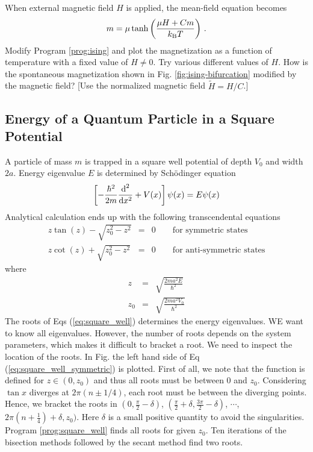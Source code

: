 \vspace{18px}
\noindent
{}

When external magnetic field  $H$ is applied, the mean-field equation becomes
\begin{equation}
m = \mu \tanh \left (\frac{\mu H + C m}{k_\text{B} T} \right )\, .
\end{equation}
Modify Program \ref{prog:ising} and plot the magnetization as a function of temperature with a fixed value of $H \ne 0$.  Try various different values of $H$.  How is the spontaneous magnetization shown in Fig. \ref{fig:ising-bifurcation} modified by the magnetic field?
[Use the normalized magnetic field $\tilde{H} = H/C$.]


\noindent
\subsection{Energy of a Quantum Particle in a Square Potential}\label{sec:quantum-well}


A particle of mass $m$ is trapped in a square well potential of depth $V_0$ and width $2a$.  Energy eigenvalue $E$ is determined by Sch\"{o}dinger equation
\begin{equation}
\left [ -\frac{\hbar^2}{2m} \frac{\text{d}^2}{\text{d} x^2} + V(x) \right ] \psi(x) = E \psi(x)
\end{equation}
Analytical calculation ends up with the following transcendental equations\cite{square_well}
\begin{subequations}\label{eq:square_well}
\begin{eqnarray}
z \tan(z) - \sqrt{z_0^2 - z^2} &=& 0 \qquad \text{for symmetric states} \label{eq:square_well_symmetric} \\
z \cot(z) + \sqrt{z_0^2 - z^2} &=& 0 \qquad \text{for anti-symmetric states}\label{eq:square_well_antisymmetric}
\end{eqnarray}
\end{subequations}
where
\begin{subequations}
\begin{eqnarray}
z &=& \sqrt{\frac{2 m a^2 E}{\hbar^2}} \\
z_0 &=& \sqrt{\frac{2 m a^2 V_0}{\hbar^2}}
\end{eqnarray}
\end{subequations}
The roots of Eqs (\ref{eq:square_well}) determines the energy eigenvalues. WE want to know all eigenvalues. However, the number of roots depends on the system parameters, which makes it difficult to bracket a root.  We need to inspect the location of the roots. In Fig. the left hand side of Eq (\ref{eq:square_well_symmetric}) is plotted. First of all, we note that the function is defined for $z \in (0, z_0)$ and thus all roots must be between $0$ and $z_0$.  Considering $\tan x$ diverges at $2\pi (n \pm 1/4)$, each root must be between the diverging points.
Hence, we bracket the roots in $(0,\frac{\pi}{2}-\delta)$, $(\frac{\pi}{2}+\delta, \frac{3\pi}{2}-\delta)$, $\cdots$, $2\pi(n+\frac{1}{4})+\delta, z_0)$.  Here $\delta$ is a small positive quantity to avoid the singularities. Program \ref{prog:square_well}  finds all roots for given $z_0$. Ten iterations of the bisection methods followed by the secant method find two roots.

